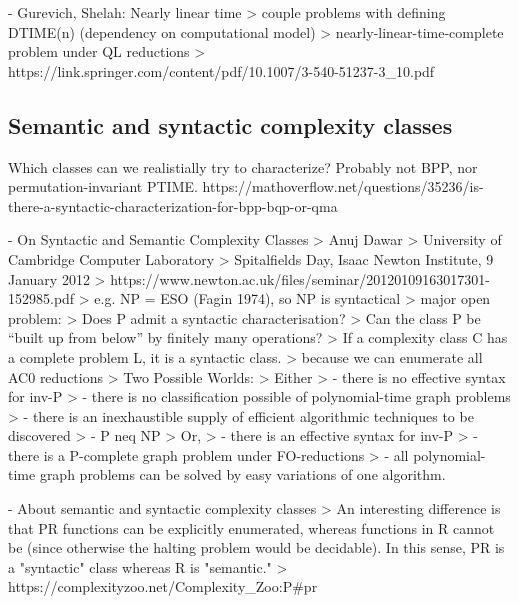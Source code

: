 - Gurevich, Shelah: Nearly linear time
> couple problems with defining DTIME(n) (dependency on computational model)  
> nearly-linear-time-complete problem under QL reductions  
> https://link.springer.com/content/pdf/10.1007/3-540-51237-3_10.pdf

\subsection{Semantic and syntactic complexity classes}
Which classes can we realistially try to characterize? Probably not BPP, nor permutation-invariant PTIME.
https://mathoverflow.net/questions/35236/is-there-a-syntactic-characterization-for-bpp-bqp-or-qma

- On Syntactic and Semantic Complexity Classes
> Anuj Dawar  
> University of Cambridge Computer Laboratory  
> Spitalfields Day, Isaac Newton Institute, 9 January 2012  
> https://www.newton.ac.uk/files/seminar/20120109163017301-152985.pdf  
> e.g. NP = ESO (Fagin 1974), so NP is syntactical  
> major open problem:  
> Does P admit a syntactic characterisation?  
> Can the class P be “built up from below” by finitely many operations?  
> If a complexity class C has a complete problem L, it is a syntactic class.  
> because we can enumerate all AC0 reductions  
> Two Possible Worlds:
> Either
> - there is no effective syntax for inv-P
> - there is no classification possible of polynomial-time graph problems
> - there is an inexhaustible supply of efficient algorithmic techniques to be discovered
> - P neq NP
> Or,
> - there is an effective syntax for inv-P
> - there is a P-complete graph problem under FO-reductions
> - all polynomial-time graph problems can be solved by easy variations of one algorithm.


- About semantic and syntactic complexity classes
> An interesting difference is that PR functions can be explicitly enumerated, whereas functions in R cannot be (since otherwise the halting problem would be decidable). In this sense, PR is a "syntactic" class whereas R is "semantic."  
> https://complexityzoo.net/Complexity_Zoo:P#pr


